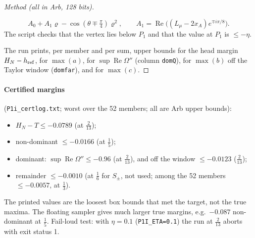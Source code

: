 \documentclass[11pt]{article}
\theoremstyle{remark}\newtheorem{remark}[theorem]{Remark}
\begin{document}
\begin{proof}[Method (all in Arb, 128 bits)]
\begin{itemize}
\[A_0+A_1\varrho-\cos(\theta\mp\tfrac\pi4)\varrho^2,\qquad A_1=\operatorname{Re}\big((L_\mu-2x_A)e^{\mp i\pi/8}\big).\]
The script checks that the vertex lies below $P_1$ and that the value at $P_1$ is $\le-\eta$.
\end{itemize}
The run prints, per member and per sum, upper bounds for the head margin $H_N-h_{\rm ref}$, for $\max(a)$, for $\sup\operatorname{Re}\Omega''$ (column \texttt{domQ}), for $\max(b)$ off the Taylor window (\texttt{domfar}), and for $\max(c)$.
\end{proof}

\paragraph{Certified margins} (\texttt{P1i\_certlog.txt}; worst over the 52 members; all are Arb upper bounds):
\begin{itemize}
\item $H_N-T\le-0.0789$ (at $\frac2{13}$);
\item non-dominant $\le-0.0166$ (at $\frac15$);
\item dominant: $\sup\operatorname{Re}\Omega''\le-0.96$ (at $\frac2{13}$), and off the window $\le-0.0123$ ($\frac2{13}$);
\item remainder $\le-0.0010$ (at $\frac16$ for $S_\pm$, not used; among the 52 members $\le-0.0057$, at $\frac13$).
\end{itemize}
The printed values are the loosest box bounds that met the target, not the true maxima. The floating sampler gives much larger true margins, e.g.\ $-0.087$ non-dominant at $\frac15$.
Fail-loud test: with $\eta=0.1$ (\texttt{P1I\_ETA=0.1}) the run at $\frac2{13}$ aborts with exit status 1.
\end{document}
